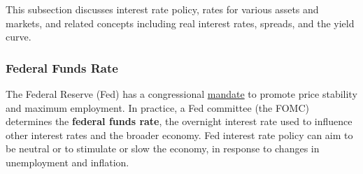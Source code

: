 \begin{minipage}{0.76\textwidth}
\small This subsection discusses interest rate policy, rates for various assets and markets, and related concepts including real interest rates, spreads, and the yield curve. 
\end{minipage}
\vspace{1mm}

\subsubsection*{Federal Funds Rate}
\vspace*{-0.5mm}

\begin{minipage}{0.76\textwidth} 
\small The Federal Reserve (Fed) has a congressional \href{https://www.federalreserve.gov/faqs/money_12848.htm}{mandate} to promote price stability and maximum employment. In practice, a Fed committee (the FOMC) determines the \textbf{federal funds rate}, the overnight interest rate used to influence other interest rates and the broader economy. Fed interest rate policy can aim to be neutral or to stimulate or slow the economy, in response to changes in unemployment and inflation.
\vspace{0.5mm}

\vspace{3.6cm}

\hspace{5mm} 
\vspace*{0.5mm}

\end{minipage}
\newpage
